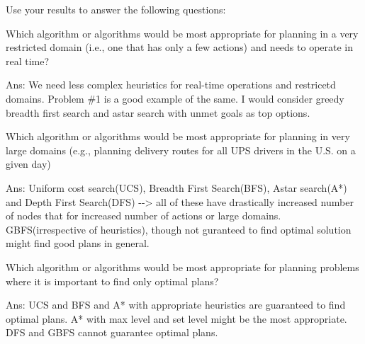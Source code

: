 \documentclass[11pt]{article}
\begin{document}
    Use your results to answer the following questions:

Which algorithm or algorithms would be most appropriate for planning in
a very restricted domain (i.e., one that has only a few actions) and
needs to operate in real time?

Ans: We need less complex heuristics for real-time operations and
restricetd domains. Problem \#1 is a good example of the same. I would
consider greedy breadth first search and astar search with unmet goals
as top options.

Which algorithm or algorithms would be most appropriate for planning in
very large domains (e.g., planning delivery routes for all UPS drivers
in the U.S. on a given day)

Ans: Uniform cost search(UCS), Breadth First Search(BFS), Astar
search(A*) and Depth First Search(DFS) -\/-\textgreater{} all of these
have drastically increased number of nodes that for increased number of
actions or large domains. GBFS(irrespective of heuristics), though not
guranteed to find optimal solution might find good plans in general.

Which algorithm or algorithms would be most appropriate for planning
problems where it is important to find only optimal plans?

Ans: UCS and BFS and A* with appropriate heuristics are guaranteed to
find optimal plans. A* with max level and set level might be the most
appropriate. DFS and GBFS cannot guarantee optimal plans.


    
    
    
    
\end{document}
